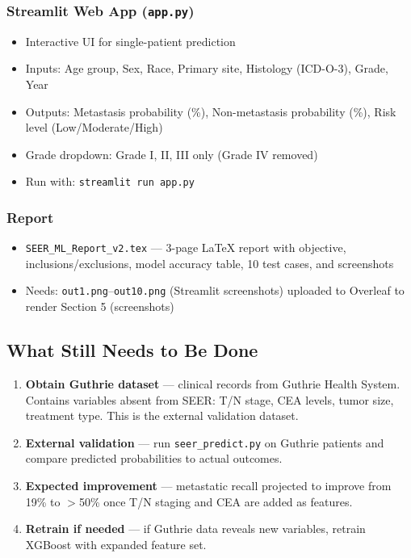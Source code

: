 \documentclass[11pt,letterpaper]{article}
\begin{document}
\subsubsection{Streamlit Web App (\texttt{app.py})}
\begin{itemize}
  \item Interactive UI for single-patient prediction
  \item Inputs: Age group, Sex, Race, Primary site, Histology (ICD-O-3), Grade, Year
  \item Outputs: Metastasis probability (\%), Non-metastasis probability (\%),
        Risk level (Low/Moderate/High)
  \item Grade dropdown: Grade I, II, III only (Grade IV removed)
  \item Run with: \texttt{streamlit run app.py}
\end{itemize}

\subsubsection{Report}
\begin{itemize}
  \item \texttt{SEER\_ML\_Report\_v2.tex} — 3-page LaTeX report with objective,
        inclusions/exclusions, model accuracy table, 10 test cases, and screenshots
  \item Needs: \texttt{out1.png}–\texttt{out10.png} (Streamlit screenshots) uploaded
        to Overleaf to render Section 5 (screenshots)
\end{itemize}

\subsection{What Still Needs to Be Done}

\begin{tcolorbox}[colback=warnred!8, colframe=warnred,
  title=\textbf{Phase 2 — Guthrie Dataset External Validation (PENDING)}]
\begin{enumerate}
  \item \textbf{Obtain Guthrie dataset} — clinical records from Guthrie Health System.
        Contains variables absent from SEER: T/N stage, CEA levels, tumor size,
        treatment type. This is the external validation dataset.
  \item \textbf{External validation} — run \texttt{seer\_predict.py} on Guthrie patients
        and compare predicted probabilities to actual outcomes.
  \item \textbf{Expected improvement} — metastatic recall projected to improve from
        19\% to $>$50\% once T/N staging and CEA are added as features.
  \item \textbf{Retrain if needed} — if Guthrie data reveals new variables, retrain
        XGBoost with expanded feature set.
\end{enumerate}
\end{tcolorbox}
\end{document}
